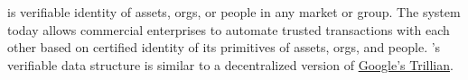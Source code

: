 \LayerTwo{} is verifiable identity of assets, orgs, or people in any market
or group. The system today allows commercial enterprises to automate
trusted transactions with each other based on certified identity of its
primitives of assets, orgs, and people.
\LayerTwo{}'s verifiable data structure is similar to a decentralized
version of
\href{https://github.com/google/trillian/blob/master/docs/papers/VerifiableDataStructures.pdf}{Google's Trillian}.
